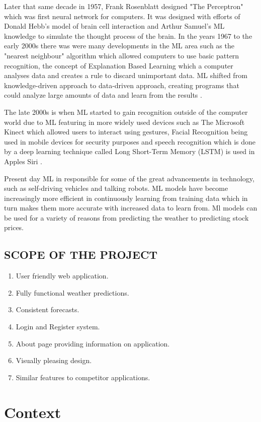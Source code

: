 Later that same decade in 1957, Frank Rosenblatt designed "The Perceptron" which was first neural network for computers. It was designed with efforts of Donald Hebb's model of brain cell interaction and Arthur Samuel's ML knowledge to simulate the thought process of the brain. In the years 1967 to the early 2000s there was were many developments in the ML area such as the "nearest neighbour" algorithm which allowed computers to use basic pattern recognition, the concept of Explanation Based Learning which a computer analyses data and creates a rule to discard unimportant data. ML shifted from knowledge-driven approach to data-driven approach, creating programs that could analyze large amounts of data and learn from the results \cite{MLAlgorithmsHistory}.

The late 2000s is when ML started to gain recognition outside of the computer world due to ML featuring in more widely used devices such as The Microsoft Kinect which allowed users to interact using gestures, Facial Recognition being used in mobile devices for security purposes and speech recognition which is done by a deep learning technique called Long Short-Term Memory (LSTM) is used in Apples Siri \cite{MLAlgorithmsHistory}.

Present day ML in responsible for some of the great advancements in technology, such as self-driving vehicles and talking robots. ML models have become increasingly more efficient in continuously learning from training data which in turn makes them more accurate with increased data to learn from. Ml models can be used for a variety of reasons from predicting the weather to predicting stock prices.
\newpage
\section{SCOPE OF THE PROJECT}
\begin{enumerate}
\item User friendly web application.
\item Fully functional weather predictions.
\item Consistent forecasts.
\item Login and Register system.
\item About page providing information on application.
\item Visually pleasing design.
\item Similar features to competitor applications.
\end{enumerate}
\chapter{Context}

